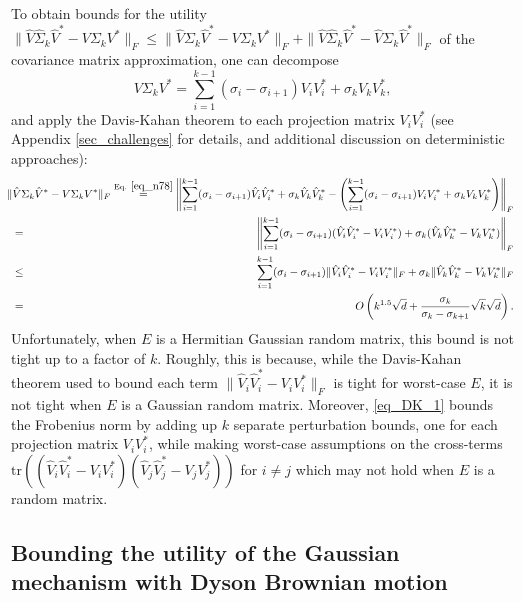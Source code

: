 \documentclass[11pt,letterpaper]{article}
\begin{document}
To obtain bounds for the utility $\|\hat{V} \hat{\Sigma}_k \hat{V}^\ast - V \Sigma_k V^\ast\|_F \leq  \|\hat{V} \Sigma_k \hat{V}^\ast - V \Sigma_k V^\ast\|_F + \|\hat{V} \hat{\Sigma}_k \hat{V}^\ast - \hat{V} \Sigma_k \hat{V}^\ast\|_F$ of the covariance matrix approximation, one can decompose 
%
\begin{equation}\label{eq_n78}
V \Sigma_k V^\ast = \sum_{i=1}^{k-1} (\sigma_i- \sigma_{i+1})V_i V_i^\ast + \sigma_k V_k V_k^\ast,
\end{equation}
%
and apply the Davis-Kahan theorem to each projection matrix $V_i V_i^\ast$ (see Appendix \ref{sec_challenges} for details, and additional discussion on deterministic approaches):
%
\begin{eqnarray}\label{eq_DK_1}
    & &\!\!\!\!\!\!\!\!\!\!\!\!\!\!\! \|\hat{V} \Sigma_k \hat{V}^\ast - V \Sigma_k V^\ast\|_F 
    \stackrel{\textrm{Eq. } \eqref{eq_n78}}{=} \left\|\sum_{i=1}^{k-1} (\sigma_i- \sigma_{i+1})\hat{V}_i \hat{V}_i^\ast + \sigma_k \hat{V}_k \hat{V}_k^\ast - \left(\sum_{i=1}^{k-1} (\sigma_i- \sigma_{i+1})V_i V_i^\ast + \sigma_k V_k V_k^\ast\right) \right\|_F \nonumber\\ 
    &=&   \left\|\sum_{i=1}^{k-1} (\sigma_i - \sigma_{i+1}) (\hat{V}_i \hat{V}_i^\ast - V_i V_i^\ast) + \sigma_k (\hat{V}_k \hat{V}_k^\ast - V_k V_k^\ast)\right\|_F \nonumber\\
    &\leq & \sum_{i=1}^{k-1} (\sigma_i - \sigma_{i+1}) \|\hat{V}_i \hat{V}_i^\ast - V_i V_i^\ast\|_F + \sigma_k \|\hat{V}_k \hat{V}_k^\ast - V_k V_k^\ast\|_F \nonumber\\
    & = & O\left(k^{1.5} \sqrt{d} + \frac{\sigma_k}{\sigma_k - \sigma_{k+1}} \sqrt{k} \sqrt{d}\right).
\end{eqnarray}
%
Unfortunately, when $E$ is a Hermitian Gaussian random matrix, this bound is not tight up to a factor of $k$.
%
%
Roughly, this is because, while the  Davis-Kahan theorem used to bound each term $\|\hat{V}_i \hat{V}_i^\ast - V_i V_i^\ast\|_F$ is tight for worst-case $E$, it is not tight when $E$ is a Gaussian random matrix.
%
Moreover, \eqref{eq_DK_1} bounds the Frobenius norm by adding up $k$ separate perturbation bounds, one for each projection matrix $V_i V_i^\ast$, while making worst-case assumptions on the cross-terms $\mathrm{tr} \left((\hat{V}_i \hat{V}_i^\ast - V_i V_i^\ast)   (\hat{V}_j \hat{V}_j^\ast - V_j V_j^\ast)\right)$ for $i \neq j$ which may not hold when $E$ is a random matrix.
%

\subsection{Bounding the utility of the Gaussian mechanism with Dyson Brownian motion}
\end{document}
